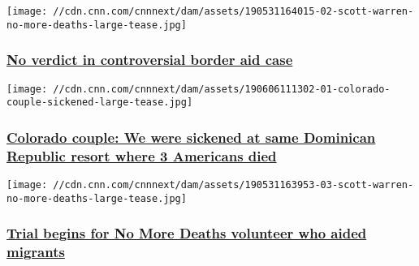 \href{/2019/06/11/us/verdict-scott-warren-no-more-deaths-migrant-trial-invs/index.html}{}

\texttt{[image: //cdn.cnn.com/cnnnext/dam/assets/190531164015-02-scott-warren-no-more-deaths-large-tease.jpg]}

\hypertarget{no-verdict-in-controversial-border-aid-case}{%
\subsubsection{\texorpdfstring{\href{/2019/06/11/us/verdict-scott-warren-no-more-deaths-migrant-trial-invs/index.html}{No
verdict in controversial border aid
case}}{No verdict in controversial border aid case}}\label{no-verdict-in-controversial-border-aid-case}}

\href{/2019/06/06/health/bahia-principe-dominican-republic-colorado-couple-sickened/index.html}{}

\texttt{[image: //cdn.cnn.com/cnnnext/dam/assets/190606111302-01-colorado-couple-sickened-large-tease.jpg]}

\hypertarget{colorado-couple-we-were-sickened-at-same-dominican-republic-resort-where-3-americans-died}{%
\subsubsection{\texorpdfstring{\href{/2019/06/06/health/bahia-principe-dominican-republic-colorado-couple-sickened/index.html}{Colorado
couple: We were sickened at same Dominican Republic resort where 3
Americans
died}}{Colorado couple: We were sickened at same Dominican Republic resort where 3 Americans died}}\label{colorado-couple-we-were-sickened-at-same-dominican-republic-resort-where-3-americans-died}}

\href{/2019/06/03/us/trial-scott-warren-no-more-deaths-volunteer-migrants-arizona-invs/index.html}{}

\texttt{[image: //cdn.cnn.com/cnnnext/dam/assets/190531163953-03-scott-warren-no-more-deaths-large-tease.jpg]}

\hypertarget{trial-begins-for-no-more-deaths-volunteer-who-aided-migrants}{%
\subsubsection{\texorpdfstring{\href{/2019/06/03/us/trial-scott-warren-no-more-deaths-volunteer-migrants-arizona-invs/index.html}{Trial
begins for No More Deaths volunteer who aided
migrants}}{Trial begins for No More Deaths volunteer who aided migrants}}\label{trial-begins-for-no-more-deaths-volunteer-who-aided-migrants}}

